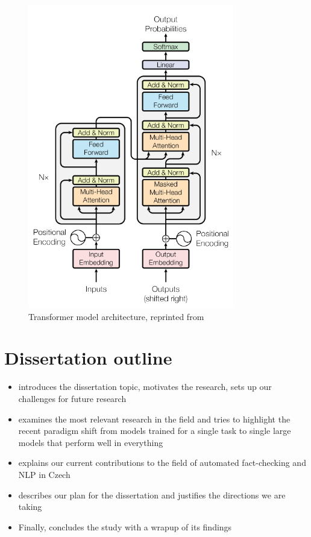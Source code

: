 \begin{figure}
    \includegraphics[width=9cm]{fig/transformer.pdf}
    \caption{Transformer model architecture, reprinted from~\cite{vaswani}}
    \label{fig:transformer}
    \end{figure}

\section{Dissertation outline}
 
\begin{itemize}
\item {} introduces the dissertation topic, motivates the research, sets up our challenges for future research 

\item {} examines the most relevant research in the field and tries to highlight the recent paradigm shift from models trained for a single task to single large models that perform well in everything

\item {} explains our current contributions to the field of automated fact-checking and NLP in Czech

\item {} describes our plan for the dissertation and justifies the directions we are taking

\item Finally, {} concludes the study with a wrapup of its findings

\end{itemize}

